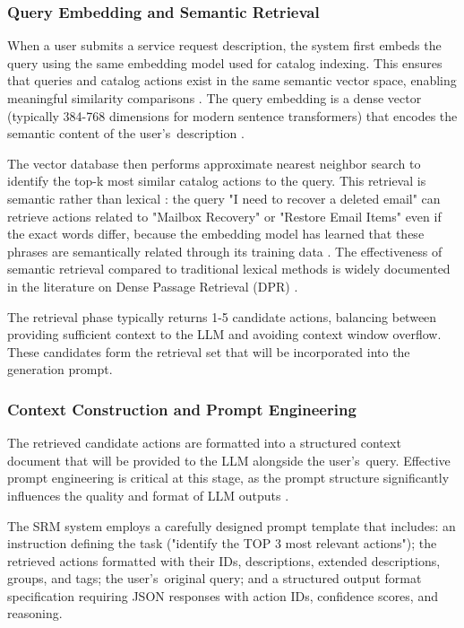 \subsubsection{Query Embedding and Semantic Retrieval}

When a user submits a service request description, the system first embeds the query using the same embedding model used for catalog indexing. This ensures that queries and catalog actions exist in the same semantic vector space, enabling meaningful similarity comparisons \cite{karpukhin-etal-2020-dense}. The query embedding is a dense vector (typically 384-768 dimensions for modern sentence transformers) that encodes the semantic content of the user's~description \cite{karpukhin-etal-2020-dense}.

The vector database then performs approximate nearest neighbor search to identify the top-k most similar catalog actions to the query. This retrieval is semantic rather than lexical \cite{karpukhin-etal-2020-dense}: the query "I need to recover a deleted email" can retrieve actions related to "Mailbox Recovery" or "Restore Email Items" even if the exact words differ, because the embedding model has learned that these phrases are semantically related through its training data \cite{karpukhin-etal-2020-dense}.
The effectiveness of semantic retrieval compared to traditional lexical methods is widely documented in the literature on Dense Passage Retrieval (DPR) \cite{karpukhin-etal-2020-dense}.

The retrieval phase typically returns 1-5 candidate actions, balancing between providing sufficient context to the LLM and avoiding context window overflow. These candidates form the retrieval set that will be incorporated into the generation prompt.

\subsubsection{Context Construction and Prompt Engineering}

The retrieved candidate actions are formatted into a structured context document that will be provided to the LLM alongside the user's~query. Effective prompt engineering is critical at this stage, as the prompt structure significantly influences the quality and format of LLM outputs \cite{wei2023chainofthoughtpromptingelicitsreasoning}.

The SRM system employs a carefully designed prompt template that includes: an instruction defining the task ("identify the TOP 3 most relevant actions"); the retrieved actions formatted with their IDs, descriptions, extended descriptions, groups, and tags; the user's~original query; and a structured output format specification requiring JSON responses with action IDs, confidence scores, and reasoning.

